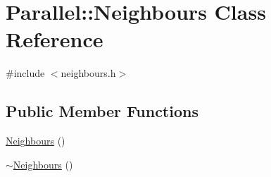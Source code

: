 \hypertarget{class_parallel_1_1_neighbours}{}\section{Parallel\+::Neighbours Class Reference}
\label{class_parallel_1_1_neighbours}


{\ttfamily \#include $<$neighbours.\+h$>$}

\subsection*{Public Member Functions}
\begin{DoxyCompactItemize}
\item 
\mbox{\hyperlink{class_parallel_1_1_neighbours_a2bf11efc3bb079e65e9126c7a10d0097}{Neighbours}} ()
\item 
\mbox{\hyperlink{class_parallel_1_1_neighbours_aba4f2d9818bc95b3e84255f04be64541}{$\sim$\+Neighbours}} ()
\end{DoxyCompactItemize}

